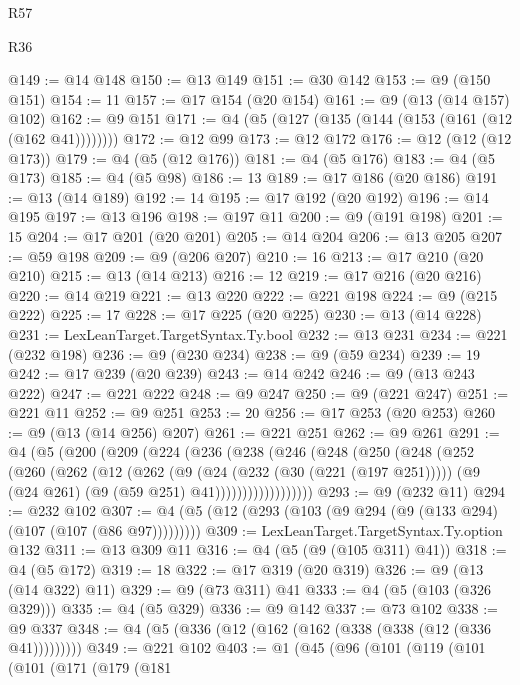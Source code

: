 \begin{lexlean}{R57}
\begin{lexlean}{R36}
\begin{coremodule}
{{{{{{{{{{{{{{{{{{{{{{{{{{{{{{{{{{{{{{{{{{{{{{{{{{{{{{{{{{{{{{{{{{{{{{{{{{{{{{{{{{@149 := @14 @148
@150 := @13 @149
@151 := @30 @142
@153 := @9 (@150 @151)
@154 := 11
@157 := @17 @154 (@20 @154)
@161 := @9 (@13 (@14 @157) @102)
@162 := @9 @151
@171 := @4 (@5 (@127 (@135 (@144 (@153 (@161 (@12 (@162 @41))))))))
@172 := @12 @99
@173 := @12 @172
@176 := @12 (@12 (@12 @173))
@179 := @4 (@5 (@12 @176))
@181 := @4 (@5 @176)
@183 := @4 (@5 @173)
@185 := @4 (@5 @98)
@186 := 13
@189 := @17 @186 (@20 @186)
@191 := @13 (@14 @189)
@192 := 14
@195 := @17 @192 (@20 @192)
@196 := @14 @195
@197 := @13 @196
@198 := @197 @11
@200 := @9 (@191 @198)
@201 := 15
@204 := @17 @201 (@20 @201)
@205 := @14 @204
@206 := @13 @205
@207 := @59 @198
@209 := @9 (@206 @207)
@210 := 16
@213 := @17 @210 (@20 @210)
@215 := @13 (@14 @213)
@216 := 12
@219 := @17 @216 (@20 @216)
@220 := @14 @219
@221 := @13 @220
@222 := @221 @198
@224 := @9 (@215 @222)
@225 := 17
@228 := @17 @225 (@20 @225)
@230 := @13 (@14 @228)
@231 := LexLeanTarget.TargetSyntax.Ty.bool
@232 := @13 @231
@234 := @221 (@232 @198)
@236 := @9 (@230 @234)
@238 := @9 (@59 @234)
@239 := 19
@242 := @17 @239 (@20 @239)
@243 := @14 @242
@246 := @9 (@13 @243 @222)
@247 := @221 @222
@248 := @9 @247
@250 := @9 (@221 @247)
@251 := @221 @11
@252 := @9 @251
@253 := 20
@256 := @17 @253 (@20 @253)
@260 := @9 (@13 (@14 @256) @207)
@261 := @221 @251
@262 := @9 @261
@291 := @4
    (@5
      (@200
        (@209
          (@224
            (@236
              (@238
                (@246
                  (@248
                    (@250
                      (@248
                        (@252
                          (@260
                            (@262
                              (@12
                                (@262
                                  (@9
                                    (@24 (@232 (@30 (@221 (@197 @251)))))
                                    (@9 (@24 @261) (@9 (@59 @251) @41))))))))))))))))))
@293 := @9 (@232 @11)
@294 := @232 @102
@307 := @4 (@5 (@12 (@293 (@103 (@9 @294 (@9 (@133 @294) (@107 (@107 (@86 @97)))))))))
@309 := LexLeanTarget.TargetSyntax.Ty.option @132
@311 := @13 @309 @11
@316 := @4 (@5 (@9 (@105 @311) @41))
@318 := @4 (@5 @172)
@319 := 18
@322 := @17 @319 (@20 @319)
@326 := @9 (@13 (@14 @322) @11)
@329 := @9 (@73 @311) @41
@333 := @4 (@5 (@103 (@326 @329)))
@335 := @4 (@5 @329)
@336 := @9 @142
@337 := @73 @102
@338 := @9 @337
@348 := @4 (@5 (@336 (@12 (@162 (@162 (@338 (@338 (@12 (@336 @41)))))))))
@349 := @221 @102
@403 := @1
    (@45
      (@96
        (@101
          (@119
            (@101
              (@101
                (@171
                  (@179
                    (@181
}}}}}}}}}}}}}}}}}}}}}}}}}}}}}}}}}}}}}}}}}}}}}}}}}}}}}}}}}}}}}}}}}}}}}}}}}}}}}}}}}}
\end{coremodule}
\end{lexlean}
\end{lexlean}
